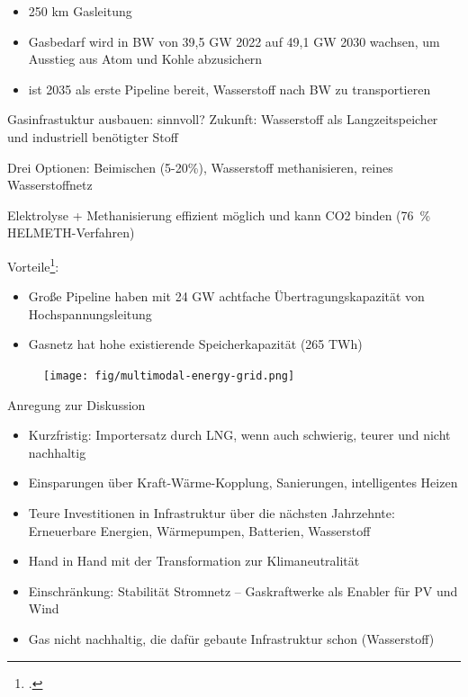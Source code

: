 \documentclass[10pt]{beamer}
\begin{document}
\begin{frame}
  \begin{itemize}
    \item 250 km Gasleitung
    \item Gasbedarf wird in BW von 39,5 GW 2022 auf 49,1 GW 2030 wachsen, um Ausstieg aus Atom und Kohle abzusichern
    \item ist 2035 als erste Pipeline bereit, Wasserstoff nach BW zu transportieren
  \end{itemize}

  \centering
\end{frame}

\begin{frame}{Gasinfrastuktur ausbauen: sinnvoll?}
  Zukunft: Wasserstoff als Langzeitspeicher und industriell benötigter Stoff

  Drei Optionen: Beimischen (5-20\%), Wasserstoff methanisieren, reines Wasserstoffnetz

  Elektrolyse + Methanisierung effizient möglich und kann CO2 binden (76~\% HELMETH-Verfahren)

  Vorteile\footcite{iis}: 
  \begin{itemize}
    \item Große Pipeline haben mit 24 GW achtfache Übertragungskapazität von Hochspannungsleitung
    \item Gasnetz hat hohe existierende Speicherkapazität (265 TWh)
  \end{itemize}
\end{frame}

\begin{frame}
\begin{figure}
\texttt{[image: fig/multimodal-energy-grid.png]}

\scriptsize{}
\end{figure}
\end{frame}

\begin{frame}{Anregung zur Diskussion}
    \begin{itemize}
      \item Kurzfristig: Importersatz durch LNG, wenn auch schwierig, teurer und nicht nachhaltig  
      \item Einsparungen über Kraft-Wärme-Kopplung, Sanierungen, intelligentes Heizen
      \item Teure Investitionen in Infrastruktur über die nächsten Jahrzehnte: Erneuerbare Energien, Wärmepumpen, Batterien, Wasserstoff
      \item Hand in Hand mit der Transformation zur Klimaneutralität 
      \item Einschränkung: Stabilität Stromnetz -- Gaskraftwerke als Enabler für PV und Wind
      \item Gas nicht nachhaltig, die dafür gebaute Infrastruktur schon (Wasserstoff)
    \end{itemize}
\end{frame}

\begin{frame}[allowframebreaks]

  \printbibliography

\end{frame}
\end{document}
